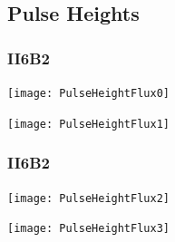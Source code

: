 \documentclass[9pt]{beamer}
\begin{document}
\subsection{Pulse Heights}
\begin{frame}
	\frametitle{II6B2}
	\begin{center}
		\begin{minipage}{5.5cm}
			\centering
			\texttt{[image: PulseHeightFlux0]}\\
		\end{minipage}
		\begin{minipage}{5.5cm}
			\centering
			\texttt{[image: PulseHeightFlux1]}\\
		\end{minipage}
	\end{center}
\end{frame}
\begin{frame}
	\frametitle{II6B2}
	\begin{center}
		\begin{minipage}{5.5cm}
			\centering
			\texttt{[image: PulseHeightFlux2]}\\
		\end{minipage}
		\begin{minipage}{5.5cm}
			\centering
			\texttt{[image: PulseHeightFlux3]}\\
		\end{minipage}
	\end{center}
\end{frame}
\end{document}
